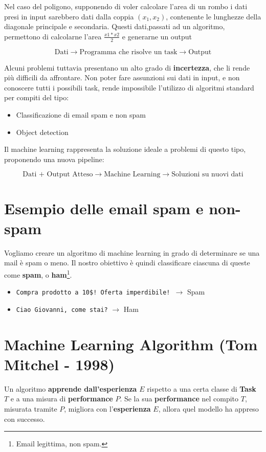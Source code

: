 Nel caso del poligono, supponendo di voler calcolare l'area di un rombo i dati presi in input sarebbero dati dalla coppia $(x_1,x_2)$, contenente le lunghezze della diagonale principale e secondaria.
Questi dati,passati ad un algoritmo, permettono di calcolarne l'area $\frac{x1*x2}{2}$ e generarne un output

$$
\text{Dati} \to \text{Programma che risolve un task} \to \text{Output}
$$

Alcuni problemi tuttavia presentano un alto grado di \textbf{incertezza}, che li rende più difficili da affrontare. Non poter fare assunzioni sui dati in input, e non conoscere tutti i possibili task, rende impossibile l'utilizzo di algoritmi standard per compiti del tipo:

\begin{itemize}
\item Classificazione di email spam e non spam
\item Object detection
\end{itemize}

Il machine learning rappresenta la soluzione ideale a problemi di questo tipo, proponendo una nuova pipeline:

$$
\text{Dati + Output Atteso} \to \text{Machine Learning} \to \text{Soluzioni su nuovi dati}
$$

\section{Esempio delle email spam e non-spam}

Vogliamo creare un algoritmo di machine learning in grado di determinare se una mail è spam o meno. Il nostro obiettivo è quindi classificare ciascuna di queste come \textbf{spam}, o \textbf{ham}\footnote{Email legittima, non spam.}.

\begin{itemize}
    \item \verb|Compra prodotto a 10$! Oferta imperdibile! |$\rightarrow$ Spam
    \item \verb|Ciao Giovanni, come stai?| $\rightarrow$ Ham
\end{itemize}

\section{Machine Learning Algorithm (Tom Mitchel - 1998)}

Un algoritmo \textbf{apprende dall'esperienza} $E$ rispetto a una certa classe di \textbf{Task} $T$ e a una misura di \textbf{performance} $P$. Se la sua \textbf{performance} nel compito $T$, misurata tramite $P$, migliora con l’\textbf{esperienza }$E$, allora quel modello ha appreso con successo.

